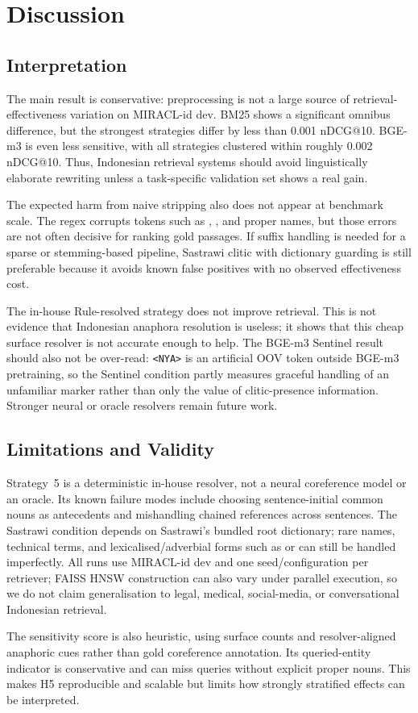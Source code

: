 \section{Discussion}
\label{sec:discussion}

\subsection{Interpretation}

The main result is conservative:  preprocessing is not a large source of retrieval-effectiveness variation on MIRACL-id dev. BM25 shows a significant omnibus difference, but the strongest strategies differ by less than 0.001 nDCG@10. BGE-m3 is even less sensitive, with all strategies clustered within roughly 0.002 nDCG@10. Thus, Indonesian retrieval systems should avoid linguistically elaborate rewriting unless a task-specific validation set shows a real gain.

The expected harm from naive stripping also does not appear at benchmark scale. The regex corrupts tokens such as , , and proper names, but those errors are not often decisive for ranking gold passages. If suffix handling is needed for a sparse or stemming-based pipeline, Sastrawi clitic with dictionary guarding is still preferable because it avoids known false positives with no observed effectiveness cost.

The in-house Rule-resolved strategy does not improve retrieval. This is not evidence that Indonesian anaphora resolution is useless; it shows that this cheap surface resolver is not accurate enough to help. The BGE-m3 Sentinel result should also not be over-read: \texttt{<NYA>} is an artificial OOV token outside BGE-m3 pretraining, so the Sentinel condition partly measures graceful handling of an unfamiliar marker rather than only the value of clitic-presence information. Stronger neural or oracle resolvers remain future work.

\subsection{Limitations and Validity}

Strategy~5 is a deterministic in-house resolver, not a neural coreference model or an oracle. Its known failure modes include choosing sentence-initial common nouns as antecedents and mishandling chained  references across sentences. The Sastrawi condition depends on Sastrawi's bundled root dictionary; rare names, technical terms, and lexicalised/adverbial forms such as  or  can still be handled imperfectly. All runs use MIRACL-id dev and one seed/configuration per retriever; FAISS HNSW construction can also vary under parallel execution, so we do not claim generalisation to legal, medical, social-media, or conversational Indonesian retrieval.

The sensitivity score is also heuristic, using surface counts and resolver-aligned anaphoric cues rather than gold coreference annotation. Its queried-entity indicator is conservative and can miss queries without explicit proper nouns. This makes H5 reproducible and scalable but limits how strongly stratified effects can be interpreted.
